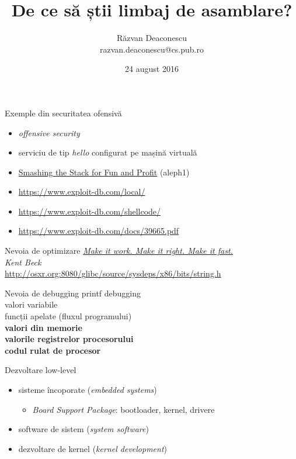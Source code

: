 \documentclass{simple}
\title[De ce asm?]{De ce să știi limbaj de asamblare?}
\institute{Informatica la Castel 2016 (Macea, Arad)}
\author[Răzvan Deaconescu]{Răzvan Deaconescu \\
razvan.deaconescu@cs.pub.ro}
\date{24 august 2016}
\begin{document}
\frame{\titlepage}

\begin{frame}{Exemple din securitatea ofensivă}
  \begin{itemize}
    \pause \item \textit{offensive security}
    \pause \item serviciu de tip \textit{hello} configurat pe mașină virtuală
    \pause \item \href{http://phrack.org/issues/49/14.html}{Smashing the Stack for Fun and Profit} (aleph1)
    \pause \item \url{https://www.exploit-db.com/local/}
    \pause \item \url{https://www.exploit-db.com/shellcode/}
    \pause \item \url{https://www.exploit-db.com/docs/39665.pdf}
  \end{itemize}
\end{frame}

\begin{frame}{Nevoia de optimizare}
  \centering
  \pause
  \textit{\href{http://c2.com/cgi/wiki?MakeItWorkMakeItRightMakeItFast}{Make it work. Make it right. Make it fast.}} \\
  \vspace{3mm}
  \hfill \textit{Kent Beck} \\
  \pause
  \vspace{1cm}
  \footnotesize{\url{http://osxr.org:8080/glibc/source/sysdeps/x86/bits/string.h}}
\end{frame}

\begin{frame}{Nevoia de debugging}
  \centering
  \pause printf debugging\\
  \pause valori variabile\\
  \pause funcții apelate (fluxul programului)\\
  \pause \textbf{valori din memorie}\\
  \pause \textbf{valorile registrelor procesorului}\\
  \pause \textbf{codul rulat de procesor}\\
\end{frame}

\begin{frame}{Dezvoltare low-level}
  \begin{itemize}
    \pause \item sisteme încoporate (\textit{embedded systems})
      \begin{itemize}
        \pause \item \textit{Board Support Package}: bootloader, kernel, drivere
      \end{itemize}
    \pause \item software de sistem (\textit{system software})
    \pause \item dezvoltare de kernel (\textit{kernel development})
  \end{itemize}
\end{frame}
\end{document}
